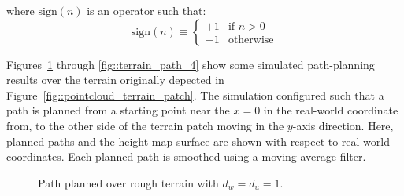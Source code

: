 			where $\text{sign}(n)$ is an operator such that:
				\begin{equation}
					\text{sign}(n) \equiv
					\begin{cases}
							+1 &	\text{if } n > 0 \\
						    -1 &	\text{otherwise}
					\end{cases}
				\end{equation}

			Figures~\ref{fig::terrain_path_1} through \ref{fig::terrain_path_4} show some simulated path-planning results over the terrain originally depected in Figure~\ref{fig::pointcloud_terrain_patch}. The simulation configured such that a path is planned from a starting point near the $x=0$ in the real-world coordinate from, to the other side of the terrain patch moving in the $y$-axis direction. Here, planned paths and the height-map surface are shown with respect to real-world coordinates. Each planned path is smoothed using a moving-average filter.
				\begin{figure}
					\centering
					\caption{Path planned over rough terrain with $d_{w}=d_{u}=1$.}
					\label{fig::terrain_path_1}
				\end{figure}
